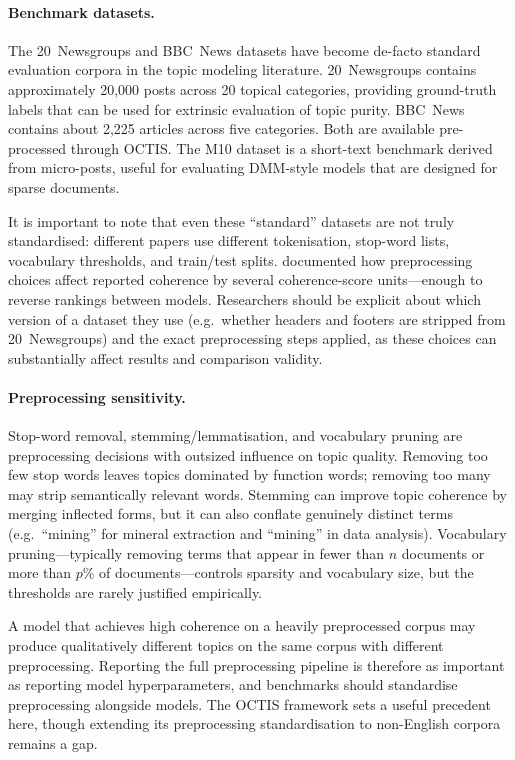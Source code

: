 \documentclass[11pt,a4paper]{article}
\begin{document}
\paragraph{Benchmark datasets.}
The 20~Newsgroups and BBC~News datasets have become de-facto standard
evaluation corpora in the topic modeling literature.
20~Newsgroups contains approximately 20,000 posts across 20 topical
categories, providing ground-truth labels that can be used for
extrinsic evaluation of topic purity.
BBC~News contains about 2,225 articles across five categories.
Both are available pre-processed through OCTIS.
The M10 dataset \parencite{terragni2021octis} is a short-text
benchmark derived from micro-posts, useful for evaluating DMM-style
models that are designed for sparse documents.

It is important to note that even these ``standard'' datasets are not
truly standardised: different papers use different tokenisation,
stop-word lists, vocabulary thresholds, and train/test splits.
\textcite{terragni2021octis} documented how preprocessing choices
affect reported coherence by several coherence-score units---enough to
reverse rankings between models.
Researchers should be explicit about which version of a dataset they
use (e.g.\ whether headers and footers are stripped from 20~Newsgroups)
and the exact preprocessing steps applied, as these choices can
substantially affect results and comparison validity.

\paragraph{Preprocessing sensitivity.}
Stop-word removal, stemming/lemmatisation, and vocabulary pruning are
preprocessing decisions with outsized influence on topic quality.
Removing too few stop words leaves topics dominated by function words;
removing too many may strip semantically relevant words.
Stemming can improve topic coherence by merging inflected forms, but it
can also conflate genuinely distinct terms (e.g.\ ``mining'' for
mineral extraction and ``mining'' in data analysis).
Vocabulary pruning---typically removing terms that appear in fewer than
$n$ documents or more than $p$\% of documents---controls sparsity and
vocabulary size, but the thresholds are rarely justified empirically.

A model that achieves high coherence on a heavily preprocessed corpus
may produce qualitatively different topics on the same corpus with
different preprocessing.
Reporting the full preprocessing pipeline is therefore as important
as reporting model hyperparameters, and benchmarks should standardise
preprocessing alongside models.
The OCTIS framework sets a useful precedent here, though extending its
preprocessing standardisation to non-English corpora remains a gap.
\end{document}
